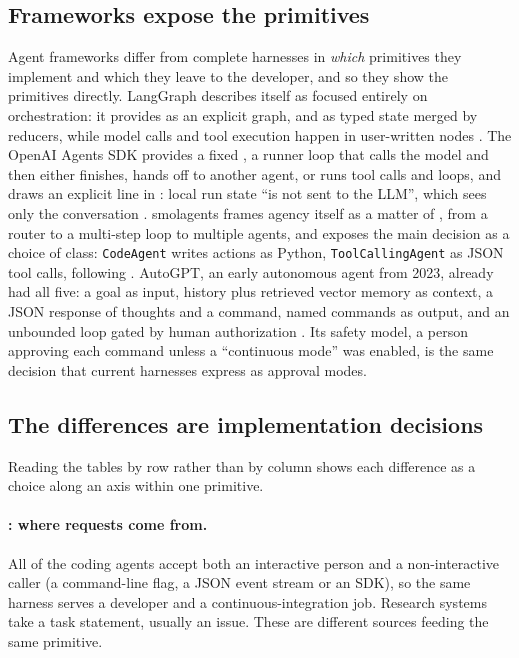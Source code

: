 \subsection{Frameworks expose the primitives}

Agent frameworks differ from complete harnesses in \emph{which} primitives they implement and which they leave to the developer, and so they show the primitives directly. LangGraph describes itself as focused entirely on orchestration: it provides  as an explicit graph, and  as typed state merged by reducers, while model calls and tool execution happen in user-written nodes \citep{langgraph}. The OpenAI Agents SDK provides a fixed , a runner loop that calls the model and then either finishes, hands off to another agent, or runs tool calls and loops, and draws an explicit line in : local run state ``is not sent to the LLM'', which sees only the conversation \citep{openaiagentssdk}. smolagents frames agency itself as a matter of , from a router to a multi-step loop to multiple agents, and exposes the main  decision as a choice of class: \texttt{CodeAgent} writes actions as Python, \texttt{ToolCallingAgent} as JSON tool calls, following \citet{wang2024codeact} \citep{smolagents}. AutoGPT, an early autonomous agent from 2023, already had all five: a goal as input, history plus retrieved vector memory as context, a JSON response of thoughts and a command, named commands as output, and an unbounded loop gated by human authorization \citep{autogpt}. Its safety model, a person approving each command unless a ``continuous mode'' was enabled, is the same decision that current harnesses express as approval modes.

\subsection{The differences are implementation decisions}

Reading the tables by row rather than by column shows each difference as a choice along an axis within one primitive.

\paragraph{: where requests come from.} All of the coding agents accept both an interactive person and a non-interactive caller (a command-line flag, a JSON event stream or an SDK), so the same harness serves a developer and a continuous-integration job. Research systems take a task statement, usually an issue. These are different sources feeding the same primitive.

